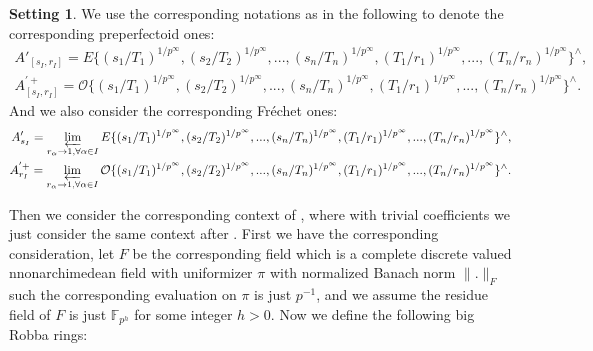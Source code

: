 \documentclass[12pt]{amsart}
\theoremstyle{definition}
\numberwithin{equation}{section}
\newtheorem{setting}[theorem]{Setting}
\begin{document}
\begin{setting}
We use the corresponding notations as in the following to denote the corresponding preperfectoid ones:
\begin{align}
A'_{[s_I,r_I]}=E\{(s_1/T_1)^{1/p^\infty},(s_2/T_2)^{1/p^\infty},...,(s_n/T_n)^{1/p^\infty},(T_1/r_1)^{1/p^\infty},...,(T_n/r_n)^{1/p^\infty}\}^\wedge,\\
A_{[s_I,r_I]}^{'+}=\mathcal{O}\{(s_1/T_1)^{1/p^\infty},(s_2/T_2)^{1/p^\infty},...,(s_n/T_n)^{1/p^\infty},(T_1/r_1)^{1/p^\infty},...,(T_n/r_n)^{1/p^\infty}\}^\wedge.	
\end{align}
And we also consider the corresponding Fr\'echet ones:
\begin{align}
A'_{s_I}= \varprojlim_{r_\alpha \rightarrow 1,\forall \alpha\in I}E\{(s_1/T_1)^{1/p^\infty},(s_2/T_2)^{1/p^\infty},...,(s_n/T_n)^{1/p^\infty},(T_1/r_1)^{1/p^\infty},...,(T_n/r_n)^{1/p^\infty}\}^\wedge,\\
A_{r_I}^{'+}= \varprojlim_{r_\alpha \rightarrow 1,\forall \alpha\in I}\mathcal{O}\{(s_1/T_1)^{1/p^\infty},(s_2/T_2)^{1/p^\infty},...,(s_n/T_n)^{1/p^\infty},(T_1/r_1)^{1/p^\infty},...,(T_n/r_n)^{1/p^\infty}\}^\wedge.	
\end{align}	
\end{setting}









	

\indent Then we consider the corresponding context of \cite[Chapter 1]{T2}, where with trivial coefficients we just consider the same context after \cite{KL2}. First we have the corresponding consideration, let $F$ be the corresponding field which is a complete discrete valued nnonarchimedean field with uniformizer $\pi$ with normalized Banach norm $\|.\|_F$ such the corresponding evaluation on $\pi$ is just $p^{-1}$, and we assume the residue field of $F$ is just $\mathbb{F}_{p^h}$ for some integer $h>0$. Now we define the following big Robba rings:
\end{document}
